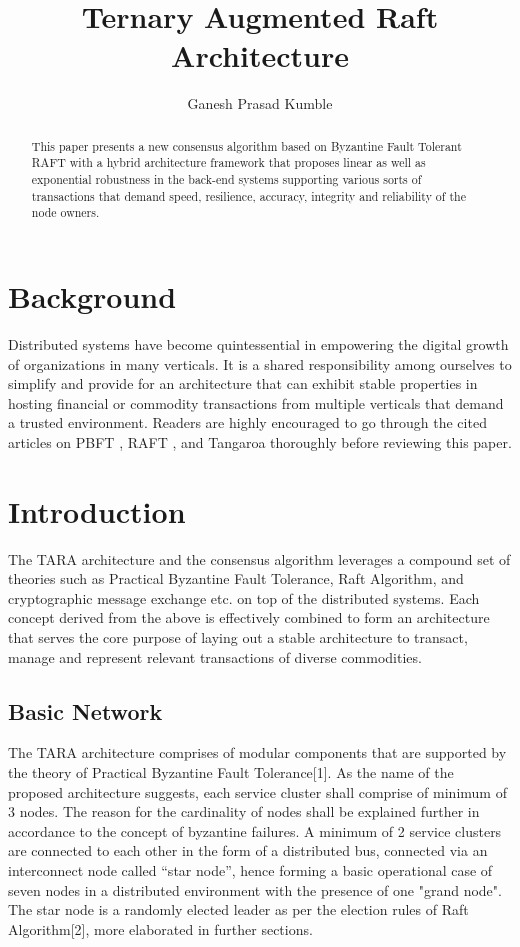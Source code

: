 \documentclass[]{article}
\title{Ternary Augmented Raft Architecture}
\author{Ganesh Prasad Kumble}
\begin{document}
\date{}
\maketitle

\begin{abstract}
This paper presents a new consensus algorithm based on Byzantine Fault Tolerant\cite{ARTICLE:1} RAFT \cite{ARTICLE:2} with a hybrid architecture framework that proposes linear as well as exponential robustness in the back-end systems supporting various sorts of transactions that demand speed, resilience, accuracy, integrity and reliability of the node owners.
\end{abstract}

\section{Background}
Distributed systems have become quintessential in empowering the digital growth of organizations in many verticals. It is a shared responsibility among ourselves to simplify and provide for an architecture that can exhibit stable properties in hosting financial or commodity transactions from multiple verticals that demand a trusted environment. Readers are highly encouraged to go through the cited articles on PBFT \cite{ARTICLE:1}, RAFT \cite{ARTICLE:2}, and Tangaroa \cite{ARTICLE:3} thoroughly before reviewing this paper.

\section{Introduction}
The TARA architecture and the consensus algorithm leverages a compound set of theories such as Practical Byzantine Fault Tolerance\cite{ARTICLE:1}, Raft Algorithm\cite{ARTICLE:2}, and cryptographic message exchange etc. on top of the distributed systems\cite{ARTICLE:3}. Each concept derived from the above is effectively combined to form an architecture that serves the core purpose of laying out a stable architecture to transact, manage and represent relevant transactions of diverse commodities.

\subsection{Basic Network}
The TARA architecture comprises of modular components that are supported by the theory of Practical Byzantine Fault Tolerance[1]. 
As the name of the proposed architecture suggests, each service cluster shall comprise of minimum of 3 nodes. The reason for the cardinality of nodes shall be explained further in accordance to the concept of byzantine failures. 
A minimum of 2 service clusters are connected to each other in the form of a distributed bus, connected via an interconnect node called “star node”, hence forming a basic operational case of seven nodes in a distributed environment with the presence of one "grand node". 
The star node is a randomly elected leader as per the election rules of Raft Algorithm[2], more elaborated in further sections.
\end{document}
